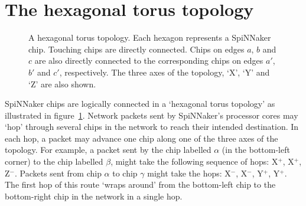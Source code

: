 	\section{The hexagonal torus topology}
		
		\begin{figure}
			\center
			
			\caption{A hexagonal torus topology. Each hexagon represents a
			SpiNNaker chip. Touching chips are directly connected. Chips on edges
			$a$, $b$ and $c$ are also directly connected to the corresponding chips
			on edges $a'$, $b'$ and $c'$, respectively. The three axes of the
			topology, `X', `Y' and `Z' are also shown.}
			\label{fig:hexagonalTorusTopology}
		\end{figure}
		
		SpiNNaker chips are logically connected in a `hexagonal torus topology'
		as illustrated in figure~\ref{fig:hexagonalTorusTopology}. Network
		packets sent by SpiNNaker's processor cores may `hop' through several
		chips in the network to reach their intended destination. In
		each hop, a packet may advance one chip along one of the three axes of
		the topology. For example, a packet sent by the chip labelled $\alpha$
		(in the bottom-left corner) to the chip labelled $\beta$, might take the
		following sequence of hops: X$^+$, X$^+$, Z$^-$. Packets sent from chip
		$\alpha$ to chip $\gamma$ might take the hops: X$^-$, X$^-$, Y$^+$,
		Y$^+$. The first hop of this route `wraps around' from the bottom-left
		chip to the bottom-right chip in the network in a single hop.
		
